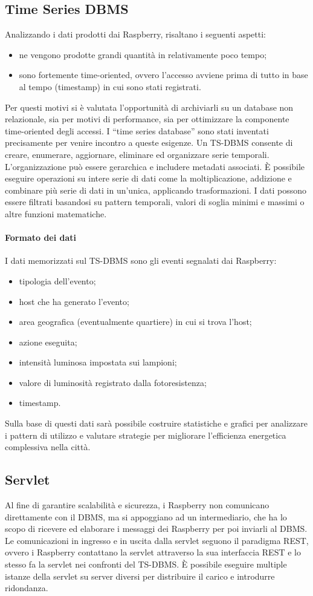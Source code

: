 \subsection{Time Series DBMS}
Analizzando i dati prodotti dai Raspberry, risaltano i seguenti aspetti:
\begin{itemize}
 \item ne vengono prodotte grandi quantità in relativamente poco tempo;
 \item sono fortemente time-oriented, ovvero l'accesso avviene prima di tutto in base al tempo (timestamp) in cui sono stati registrati.
\end{itemize}
Per questi motivi si è valutata l'opportunità di archiviarli su un database non relazionale, sia per motivi di performance, sia per ottimizzare la componente time-oriented degli accessi.
I ``time series database'' sono stati inventati precisamente per venire incontro a queste esigenze.
Un TS-DBMS consente di creare, enumerare, aggiornare, eliminare ed organizzare serie temporali.
L'organizzazione può essere gerarchica e includere metadati associati.
È possibile eseguire operazioni su intere serie di dati come la moltiplicazione, addizione e combinare più serie di dati in un'unica, applicando trasformazioni.
I dati possono essere filtrati basandosi su pattern temporali, valori di soglia minimi e massimi o altre funzioni matematiche.
\paragraph{Formato dei dati}
I dati memorizzati sul TS-DBMS sono gli eventi segnalati dai Raspberry:
\begin{itemize}
 \item tipologia dell'evento;
 \item host che ha generato l'evento;
 \item area geografica (eventualmente quartiere) in cui si trova l'host;
 \item azione eseguita;
 \item intensità luminosa impostata sui lampioni;
 \item valore di luminosità registrato dalla fotoresistenza;
 \item timestamp.
\end{itemize}
Sulla base di questi dati sarà possibile costruire statistiche e grafici per analizzare i pattern di utilizzo e valutare strategie per migliorare l'efficienza energetica complessiva nella città.

\subsection{Servlet}
Al fine di garantire scalabilità e sicurezza, i Raspberry non comunicano direttamente con il DBMS, ma si appoggiano ad un intermediario, che ha lo scopo di ricevere ed elaborare i messaggi dei Raspberry per poi inviarli al DBMS.
Le comunicazioni in ingresso e in uscita dalla servlet seguono il paradigma REST, ovvero i Raspberry contattano la servlet attraverso la sua interfaccia REST e lo stesso fa la servlet nei confronti del TS-DBMS.
È possibile eseguire multiple istanze della servlet su server diversi per distribuire il carico e introdurre ridondanza.

